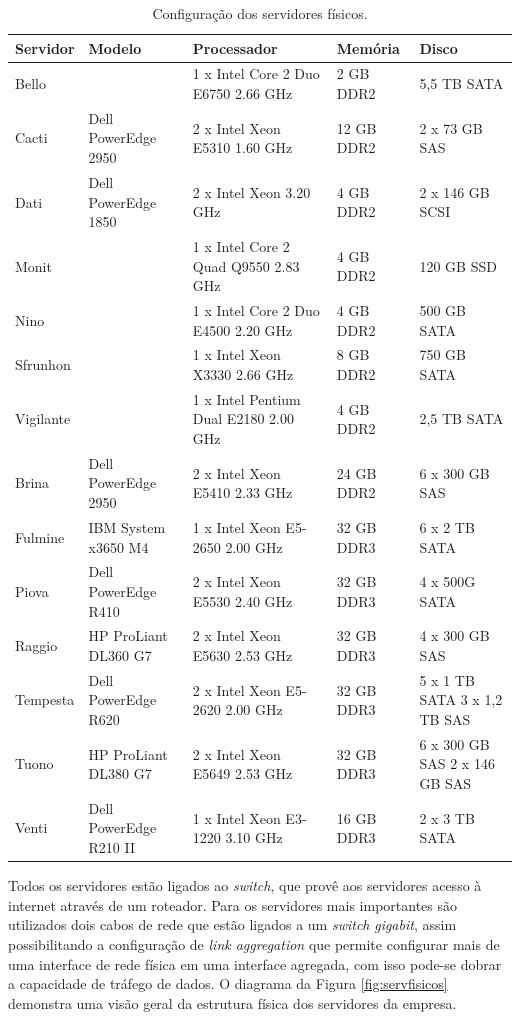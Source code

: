 \begin{table}[h!]
\caption{Configuração dos servidores físicos.}
\label{tab:servfisicos}
\begin{center}
\def\arraystretch{1}
\setlength{\tabcolsep}{0.15cm}
\begin{tabular}{|l|l|p{5.1cm}|l|p{2.1cm}|}\hline
Servidor & Modelo & Processador & Memória & Disco\\\hline
Bello & & 1 x Intel Core 2 Duo E6750 2.66 GHz & 2 GB DDR2 & 5,5 TB SATA\\\hline
Cacti & Dell PowerEdge 2950 & 2 x Intel Xeon E5310 1.60 GHz & 12 GB DDR2 & 2 x 73 GB SAS\\\hline
Dati & Dell PowerEdge 1850 & 2 x Intel Xeon 3.20 GHz & 4 GB DDR2 & 2 x 146 GB SCSI\\\hline
Monit & & 1 x Intel Core 2 Quad Q9550 2.83 GHz & 4 GB DDR2 & 120 GB SSD\\\hline
Nino & & 1 x Intel Core 2 Duo E4500 2.20 GHz & 4 GB DDR2 & 500 GB SATA\\\hline
Sfrunhon & & 1 x Intel Xeon X3330 2.66 GHz & 8 GB DDR2 & 750 GB SATA\\\hline
Vigilante & & 1 x Intel Pentium Dual E2180 2.00 GHz & 4 GB DDR2 & 2,5 TB SATA\\\hline
Brina & Dell PowerEdge 2950 & 2 x Intel Xeon E5410 2.33 GHz & 24 GB DDR2 & 6 x 300 GB SAS\\\hline
Fulmine & IBM System x3650 M4 & 1 x Intel Xeon E5-2650 2.00 GHz & 32 GB DDR3 & 6 x 2 TB SATA\\\hline
Piova & Dell PowerEdge R410 & 2 x Intel Xeon E5530 2.40 GHz & 32 GB DDR3 & 4 x 500G SATA\\\hline
Raggio & HP ProLiant DL360 G7 & 2 x  Intel Xeon E5630 2.53 GHz & 32 GB DDR3 & 4 x 300 GB SAS\\\hline
Tempesta & Dell PowerEdge R620 & 2 x Intel Xeon E5-2620 2.00 GHz & 32 GB DDR3 & 5 x 1 TB SATA 3 x 1,2 TB SAS\\\hline
Tuono & HP ProLiant DL380 G7 & 2 x Intel Xeon E5649 2.53 GHz & 32 GB DDR3 & 6 x 300 GB SAS 2 x 146 GB SAS\\\hline
Venti & Dell PowerEdge R210 II & 1 x Intel Xeon E3-1220 3.10 GHz & 16 GB DDR3 & 2 x 3 TB SATA\\\hline
\end{tabular}
\end{center}
\end{table}

Todos os servidores estão ligados ao \textit{switch}, que provê aos servidores acesso à internet através de um roteador. Para os servidores 
mais importantes são utilizados dois cabos de rede que estão ligados a um \textit{switch} \textit{gigabit}, assim possibilitando
a configuração de \textit{link aggregation} que permite configurar mais de uma interface de rede física em uma interface agregada, com isso 
pode-se dobrar a capacidade de tráfego de dados. 
O diagrama da Figura \ref{fig:servfisicos} demonstra uma visão geral da estrutura física dos servidores da empresa. 


